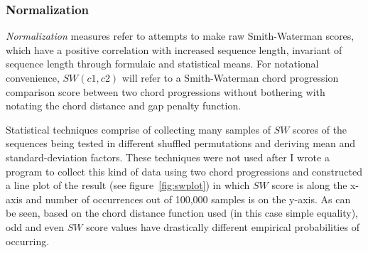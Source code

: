 \subsubsection{Normalization}

\textit{Normalization} measures refer to attempts to make raw Smith-Waterman scores, which have a positive correlation with increased sequence length, invariant of sequence length through formulaic and statistical means. For notational convenience, $SW(c1,c2)$ will refer to a Smith-Waterman chord progression comparison score between two chord progressions without bothering with notating the chord distance and gap penalty function.

Statistical techniques comprise of collecting many samples of $SW$ scores of the sequences being tested in different shuffled permutations and deriving mean and standard-deviation factors\cite{smith1985statistical}. These techniques were not used after I wrote a program to collect this kind of data using two chord progressions and constructed a line plot of the result (see figure~\ref{fig:swplot}) in which $SW$ score is along the x-axis and number of occurrences out of 100,000 samples is on the y-axis. As can be seen, based on the chord distance function used (in this case simple equality), odd and even $SW$ score values have drastically different empirical probabilities of occurring.